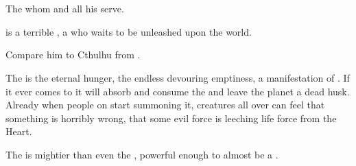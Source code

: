 \section{\Voidbringer}
The \baneking{} whom \Daggerrain{} and all his \banes{} serve. 

\Voidbringer{} is a terrible , a  who waits to be unleashed upon the world. 

Compare him to Cthulhu from .

The \Voidbringer{} is the eternal hunger, the endless devouring emptiness, a manifestation of \Bane{} . If it ever comes to \Miith{} it will absorb and consume the  and leave the planet a dead husk. Already when people on \Miith{} start summoning it, creatures all over \Miith{} can feel that something is horribly wrong, that some evil force is leeching life force from the Heart.

The \Voidbringer{} is mightier than even the \xss, powerful enough to almost be a . 


